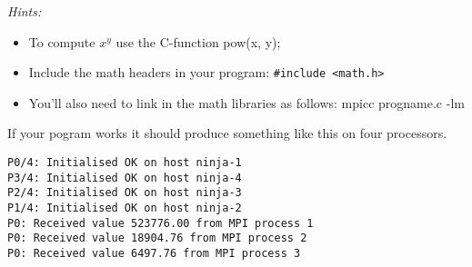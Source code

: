 \documentclass[12pt]{article}
\begin{document}
\emph{Hints:}
\begin{itemize}
  \item To compute $x^y$ use the C-function pow(x, y);
  \item Include the math headers in your program: \verb+#include <math.h>+
  \item You'll also need to link in the math libraries as follows:
     mpicc progname.c -lm
\end{itemize}

If your pogram works it should produce something like this on four processors.
\begin{verbatim}
P0/4: Initialised OK on host ninja-1
P3/4: Initialised OK on host ninja-4
P2/4: Initialised OK on host ninja-3
P1/4: Initialised OK on host ninja-2
P0: Received value 523776.00 from MPI process 1
P0: Received value 18904.76 from MPI process 2
P0: Received value 6497.76 from MPI process 3
\end{verbatim}
\end{document}
